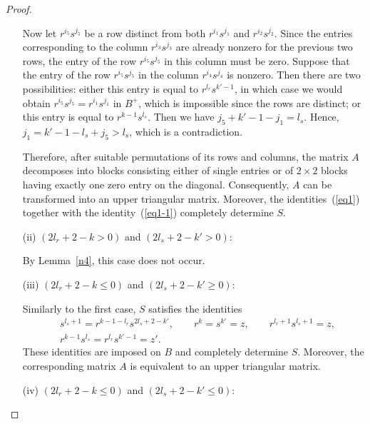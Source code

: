 \documentclass[11pt,reqno]{amsart}
\theoremstyle{plain}
\theoremstyle{remark}
\theoremstyle{definition}
\begin{document}
\begin{proof}
\begin{enumerate}
Now let $r^{i_5}s^{j_5}$ be a row distinct from both $r^{i_1}s^{j_1}$ and $r^{i_2}s^{j_2}$. Since the entries corresponding to the column $r^{i_3}s^{j_3}$ are already nonzero for the previous two rows, the entry of the row $r^{i_5}s^{j_5}$ in this column must be zero.
Suppose that the entry of the row $r^{i_5}s^{j_5}$ in the column $r^{i_4}s^{j_4}$ is nonzero. Then there are two possibilities: either this entry is equal to $r^{l_r}s^{k'-1}$, in which case we would obtain $r^{i_5}s^{j_5} = r^{i_1}s^{j_1}$ in $B^{+}$, which is impossible since the rows are distinct; or this entry is equal to $r^{k-1}s^{l_s}$.
Then we have
\(j_5 + k' - 1 - j_1 = l_s\).
Hence,
\(j_1 = k' - 1 - l_s + j_5 > l_s\),
which is a contradiction.

Therefore, after suitable permutations of its rows and columns, the matrix $A$ decomposes into blocks consisting either of single entries or of $2\times2$ blocks having exactly one zero entry on the diagonal. Consequently, $A$ can be transformed into an upper triangular matrix. Moreover, the identities~(\ref{eq1}) together with the identity~(\ref{eq1-1}) completely determine $S$.

\item[(ii)] $(2l_r+2-k> 0)$ and $(2l_s+2-k'> 0)$:

By Lemma~\ref{n4}, this case does not occur.

\item[(iii)] $(2l_r+2-k\leq 0)$ and $(2l_s+2-k'\geq 0)$:

Similarly to the first case, $S$ satisfies the identities
\[%
\begin{aligned}
&s^{l_s+1} = r^{k-1-l_r}s^{2l_s+2-k'}, \qquad
r^k = s^{k'} = z, \qquad
r^{l_r+1}s^{l_s+1} = z, \\
&r^{k-1}s^{l_s} = r^{l_r}s^{k'-1} = z'.
\end{aligned}
\]%
These identities are imposed on $B$ and completely determine $S$. Moreover, the corresponding matrix $A$ is equivalent to an upper triangular matrix.

\item[(iv)] $(2l_r+2-k\leq 0)$ and $(2l_s+2-k'\leq 0)$:


\end{enumerate}
\end{proof}
\end{document}
